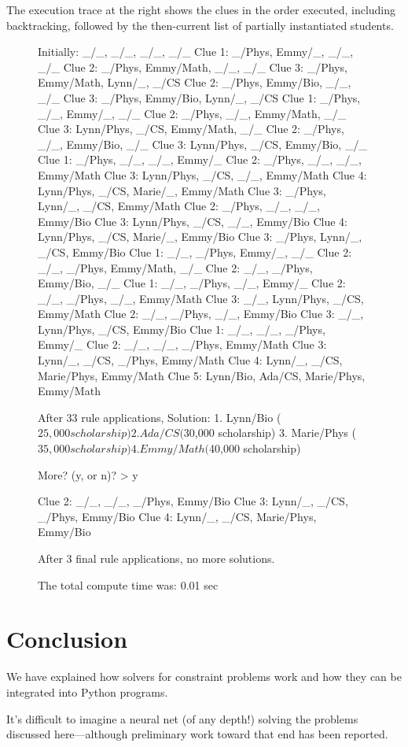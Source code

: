 The execution trace at the right shows the clues in the order executed, including backtracking, followed by the then-current list of partially instantiated students.

\begin{figure}[ht]
    \flushright
\begin{minipage}[c]{0.45\textwidth}
\begin{python1}
Initially: _/_, _/_, _/_, _/_
Clue 1: _/Phys, Emmy/_, _/_, _/_
Clue 2: _/Phys, Emmy/Math, _/_, _/_
Clue 3: _/Phys, Emmy/Math, Lynn/_, _/CS
Clue 2: _/Phys, Emmy/Bio, _/_, _/_
Clue 3: _/Phys, Emmy/Bio, Lynn/_, _/CS
Clue 1: _/Phys, _/_, Emmy/_, _/_
Clue 2: _/Phys, _/_, Emmy/Math, _/_
Clue 3: Lynn/Phys, _/CS, Emmy/Math, _/_
Clue 2: _/Phys, _/_, Emmy/Bio, _/_
Clue 3: Lynn/Phys, _/CS, Emmy/Bio, _/_
Clue 1: _/Phys, _/_, _/_, Emmy/_
Clue 2: _/Phys, _/_, _/_, Emmy/Math
Clue 3: Lynn/Phys, _/CS, _/_, Emmy/Math
Clue 4: Lynn/Phys, _/CS, Marie/_, Emmy/Math
Clue 3: _/Phys, Lynn/_, _/CS, Emmy/Math
Clue 2: _/Phys, _/_, _/_, Emmy/Bio
Clue 3: Lynn/Phys, _/CS, _/_, Emmy/Bio
Clue 4: Lynn/Phys, _/CS, Marie/_, Emmy/Bio
Clue 3: _/Phys, Lynn/_, _/CS, Emmy/Bio
Clue 1: _/_, _/Phys, Emmy/_, _/_
Clue 2: _/_, _/Phys, Emmy/Math, _/_
Clue 2: _/_, _/Phys, Emmy/Bio, _/_
Clue 1: _/_, _/Phys, _/_, Emmy/_
Clue 2: _/_, _/Phys, _/_, Emmy/Math
Clue 3: _/_, Lynn/Phys, _/CS, Emmy/Math
Clue 2: _/_, _/Phys, _/_, Emmy/Bio
Clue 3: _/_, Lynn/Phys, _/CS, Emmy/Bio
Clue 1: _/_, _/_, _/Phys, Emmy/_
Clue 2: _/_, _/_, _/Phys, Emmy/Math
Clue 3: Lynn/_, _/CS, _/Phys, Emmy/Math
Clue 4: Lynn/_, _/CS, Marie/Phys, Emmy/Math
Clue 5: Lynn/Bio, Ada/CS, Marie/Phys, Emmy/Math

After 33 rule applications,
Solution: 
	1. Lynn/Bio	($25,000 scholarship)
	2. Ada/CS	($30,000 scholarship)
	3. Marie/Phys	($35,000 scholarship)
	4. Emmy/Math	($40,000 scholarship)

More? (y, or n)? > y

Clue 2: _/_, _/_, _/Phys, Emmy/Bio
Clue 3: Lynn/_, _/CS, _/Phys, Emmy/Bio
Clue 4: Lynn/_, _/CS, Marie/Phys, Emmy/Bio

After 3 final rule applications, no more solutions.

The total compute time was: 0.01 sec
\end{python1}
\end{minipage}
\end{figure}

\section{Conclusion} \label{sec:conclusion}

We have explained how solvers for constraint problems work and how they can be integrated into Python programs. 

It's difficult to imagine a neural net (of any depth!) solving the problems discussed here---although preliminary work toward that end has been reported. \cite{xu2018towards, amel2019shallow, dubois2019towards}
